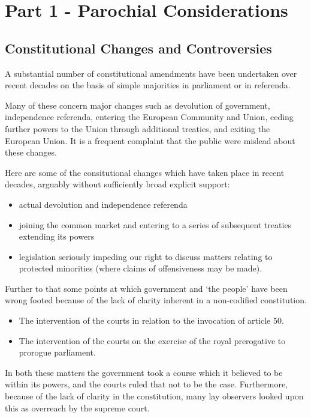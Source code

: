 \documentclass[14pt,titlepage]{extarticle}
\begin{document}
\section{Part 1 - Parochial Considerations}

\subsection{Constitutional Changes and Controversies}

A substantial number of constitutional amendments have been undertaken over recent decades on the basis of simple majorities in parliament or in referenda.

Many of these concern major changes such as devolution of government, independence referenda, entering the European Community and Union, ceding further powers to the Union through additional treaties, and exiting the European Union.
It is a frequent complaint that the public were mislead about these changes.

Here are some of the consitutional changes which have taken place in recent decades, arguably without sufficiently broad explicit support:

\begin{itemize}
\item actual devolution and independence referenda
\item joining the common market and entering to a series of subsequent treaties extending its powers
  \item legislation seriously impeding our right to discuss matters relating to protected minorities (where claims of offensiveness may be made).
  \end{itemize}

Further to that some points at which government and `the people' have been wrong footed because of the lack of clarity inherent in a non-codified constitution.

\begin{itemize}
\item The intervention of the courts in relation to the invocation of article 50.
\item The intervention of the courts on the exercise of the royal prerogative to prorogue parliament.
\end{itemize}

In both these matters the government took a course which it believed to be within its powers, and the courts ruled that not to be the case.
Furthermore, because of the lack of clarity in the constitution, many lay observers looked upon this as overreach by the supreme court.
\end{document}
